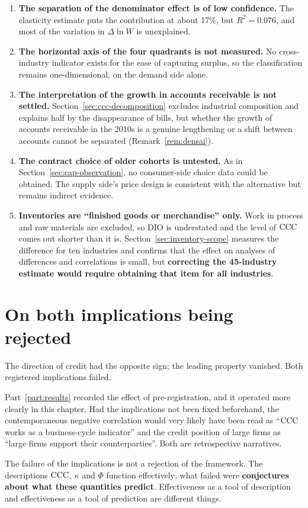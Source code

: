 \begin{enumerate}[label=(\arabic*)]
\item \textbf{The separation of the denominator effect is of low confidence.} The elasticity
estimate puts the contribution at about 17\%, but $R^2=0.076$, and most of the variation in
$\Delta\ln W$ is unexplained.

\item \textbf{The horizontal axis of the four quadrants is not measured.} No cross-industry
indicator exists for the ease of capturing surplus, so the classification remains one-dimensional,
on the demand side alone.

\item \textbf{The interpretation of the growth in accounts receivable is not settled.}
Section~\ref{sec:ccc-decomposition} excludes industrial composition and explains half by the
disappearance of bills, but whether the growth of accounts receivable in the 2010s is a genuine
lengthening or a shift between accounts cannot be separated (Remark~\ref{rem:densai}).

\item \textbf{The contract choice of older cohorts is untested.} As in
Section~\ref{sec:cap-observation}, no consumer-side choice data could be obtained. The supply
side's price design is consistent with the alternative but remains indirect evidence.

\item \textbf{Inventories are ``finished goods or merchandise'' only.} Work in process and raw
materials are excluded, so $\mathrm{DIO}$ is understated and the level of $\mathrm{CCC}$ comes out shorter
than it is. Section~\ref{sec:inventory-scope} measures the difference for ten industries and
confirms that the effect on analyses of differences and correlations is small, but
\textbf{correcting the 45-industry estimate would require obtaining that item for all
industries}.
\end{enumerate}

\section{On both implications being rejected}
\label{sec:two-rejections}

The direction of credit had the opposite sign; the leading property vanished. Both registered
implications failed.

Part~\ref{part:results} recorded the effect of pre-registration, and it operated more clearly in
this chapter. Had the implications not been fixed beforehand, the contemporaneous negative
correlation would very likely have been read as ``$\mathrm{CCC}$ works as a business-cycle indicator'' and
the credit position of large firms as ``large firms support their counterparties''. Both are
retrospective narratives.

The failure of the implications is not a rejection of the framework. The descriptions $\mathrm{CCC}$,
$\kappa$ and $\Phi$ function effectively; what failed were \textbf{conjectures about what these
quantities predict}. Effectiveness as a tool of description and effectiveness as a tool of
prediction are different things.
